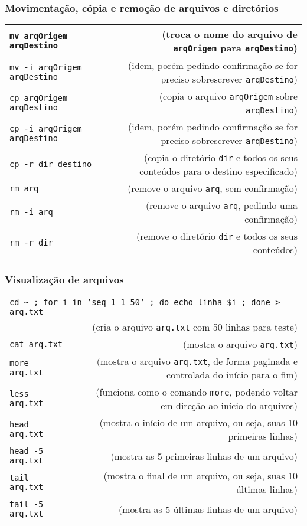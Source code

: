 \documentclass[aspectratio=169]{beamer}
\begin{document}
\begin{frame}\frametitle{Movimentação, cópia e remoção de arquivos e diretórios}
\begin{tabular}{lp{0.5cm}r}
\texttt{mv arqOrigem arqDestino} & & \tiny{(troca o nome do arquivo de \texttt{arqOrigem} para \texttt{arqDestino})}\\\hline
\texttt{mv -i arqOrigem arqDestino} & & \tiny{(idem, porém pedindo confirmação se for preciso sobrescrever \texttt{arqDestino})}\\\hline
\texttt{cp arqOrigem arqDestino} & & \tiny{(copia o arquivo \texttt{arqOrigem} sobre \texttt{arqDestino})}\\\hline
\texttt{cp -i arqOrigem arqDestino} & & \tiny{(idem, porém pedindo confirmação se for preciso sobrescrever \texttt{arqDestino})}\\\hline
\texttt{cp -r dir destino} & & \tiny{(copia o diretório \texttt{dir} e todos os seus conteúdos para o destino especificado)}\\\hline
\texttt{rm arq} & & \tiny{(remove o arquivo \texttt{arq}, sem confirmação)}\\\hline
\texttt{rm -i arq} & & \tiny{(remove o arquivo \texttt{arq}, pedindo uma confirmação)}\\\hline
\texttt{rm -r dir} & & \tiny{(remove o diretório \texttt{dir} e todos os seus conteúdos)}\\
\end{tabular}
\end{frame}

\begin{frame}\frametitle{Visualização de arquivos}
\begin{tabular}{lp{2cm}r}
\multicolumn{3}{l}{\texttt{cd \~{} ; for i in `seq 1 1 50` ; do echo linha \$i ;  done \textgreater{} arq.txt}}\\
& & \tiny{(cria o arquivo \texttt{arq.txt} com 50 linhas para teste)}\\\hline
\texttt{cat arq.txt} & & \tiny{(mostra o arquivo \texttt{arq.txt})}\\\hline
\texttt{more arq.txt} & & \tiny{(mostra o arquivo \texttt{arq.txt}, de forma paginada e controlada do início para o fim)}\\\hline
\texttt{less arq.txt} & & \tiny{(funciona como o comando \texttt{more}, podendo voltar em direção ao início do arquivos)}\\\hline
\texttt{head arq.txt} & & \tiny{(mostra o início de um arquivo, ou seja, suas 10 primeiras linhas)}\\\hline
\texttt{head -5 arq.txt} & & \tiny{(mostra as 5 primeiras linhas de um arquivo)}\\\hline
\texttt{tail arq.txt} & & \tiny{(mostra o final de um arquivo, ou seja, suas 10 últimas linhas)}\\\hline
\texttt{tail -5 arq.txt} & & \tiny{(mostra as 5 últimas linhas de um arquivo)}\\
\end{tabular}
\end{frame}
\end{document}
